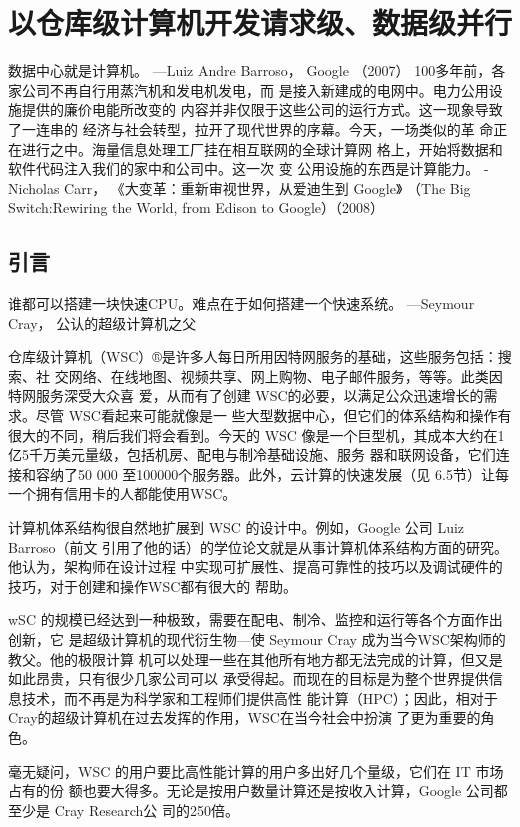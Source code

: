 \chapter{以仓库级计算机开发请求级、数据级并行}
数据中心就是计算机。
—Luiz Andre Barroso，
Google （2007）
100多年前，各家公司不再自行用蒸汽机和发电机发电，而
是接入新建成的电网中。电力公用设施提供的廉价电能所改变的
内容并非仅限于这些公司的运行方式。这一现象导致了一连串的
经济与社会转型，拉开了现代世界的序幕。今天，一场类似的革
命正在进行之中。海量信息处理工厂挂在相互联网的全球计算网
格上，开始将数据和软件代码注入我们的家中和公司中。这一次
变 公用设施的东西是计算能力。
-Nicholas Carr，
《大变革：重新审视世界，从爱迪生到 Google》
（The Big Switch:Rewiring the World, from Edison to Google）（2008）
\section{引言}
谁都可以搭建一块快速CPU。难点在于如何搭建一个快速系统。
—Seymour Cray，
公认的超级计算机之父

仓库级计算机（WSC）®是许多人每日所用因特网服务的基础，这些服务包括：搜索、社
交网络、在线地图、视频共享、网上购物、电子邮件服务，等等。此类因特网服务深受大众喜
爱，从而有了创建 WSC的必要，以满足公众迅速增长的需求。尽管 WSC看起来可能就像是一
些大型数据中心，但它们的体系结构和操作有很大的不同，稍后我们将会看到。今天的 WSC
像是一个巨型机，其成本大约在1亿5千万美元量级，包括机房、配电与制冷基础设施、服务
器和联网设备，它们连接和容纳了50 000 至100000个服务器。此外，云计算的快速发展（见
6.5节）让每一个拥有信用卡的人都能使用WSC。

计算机体系结构很自然地扩展到 WSC 的设计中。例如，Google 公司 Luiz Barroso（前文
引用了他的话）的学位论文就是从事计算机体系结构方面的研究。他认为，架构师在设计过程
中实现可扩展性、提高可靠性的技巧以及调试硬件的技巧，对于创建和操作WSC都有很大的
帮助。

wSC 的规模已经达到一种极致，需要在配电、制冷、监控和运行等各个方面作出创新，它
是超级计算机的现代衍生物—使 Seymour Cray 成为当今WSC架构师的教父。他的极限计算
机可以处理一些在其他所有地方都无法完成的计算，但又是如此昂贵，只有很少几家公司可以
承受得起。而现在的目标是为整个世界提供信息技术，而不再是为科学家和工程师们提供高性
能计算（HPC）；因此，相对于 Cray的超级计算机在过去发挥的作用，WSC在当今社会中扮演
了更为重要的角色。

毫无疑问，WSC 的用户要比高性能计算的用户多出好几个量级，它们在 IT 市场占有的份
额也要大得多。无论是按用户数量计算还是按收入计算，Google 公司都至少是 Cray Research公
司的250倍。

